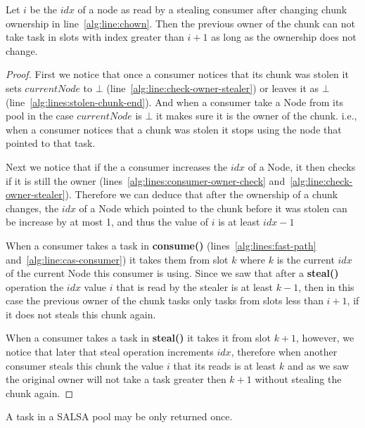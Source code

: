 \begin{lemma}
 \label{lemma:no-inc-after-steal}
 Let $i$ be the $idx$ of a node as read by a stealing consumer after changing chunk ownership in line~\ref{alg:line:chown}. Then the previous owner of the chunk can not take task in slots with index greater than $i+1$ as long as the ownership does not change.
\end{lemma}
\begin{proof}
First we notice that once a consumer notices that its chunk was stolen it sets $currentNode$ to $\bot$ (line~\ref{alg:line:check-owner-stealer}) or leaves it as $\bot$ (line~\ref{alg:lines:stolen-chunk-end}). And when a consumer take a Node from its pool in the case $currentNode
$ is $\bot$ it makes sure it is the owner of the chunk. i.e., when a consumer notices that a chunk was stolen it stops using the node that pointed to that task.

Next we notice that if the a consumer increases the $idx$ of a Node, it then checks if it is still the owner (lines~\ref{alg:lines:consumer-owner-check} and~\ref{alg:line:check-owner-stealer}). Therefore we can deduce that after the ownership of a chunk changes, the $idx$ of a Node which pointed to the chunk before it was stolen can be increase by at most 1, and thus the value of $i$ is at least $idx-1$

When a consumer takes a task in {\bf consume()} (lines~\ref{alg:lines:fast-path} and~\ref{alg:line:cas-consumer}) it takes them from slot $k$ where $k$ is the current $idx$ of the current Node this consumer is using. Since we saw that after a {\bf steal()} operation the $idx$ value $i$ that is read by the stealer is at least $k-1$, then in this case the previous owner of the chunk tasks only tasks from slots less than $i+1$, if it does not steals this chunk again.

When a consumer takes a task in {\bf steal()} it takes it from slot $k+1$, however, we notice that later that steal operation increments $idx$, therefore when another consumer steals this chunk the value $i$ that its reads is at least $k$ and as we saw the original owner will not take a task greater then $k+1$ without stealing the chunk again. 
\end{proof}

\begin{claim}
\label{salsa-consumer-claim}
A task in a SALSA pool may be only returned once.
\end{claim}

